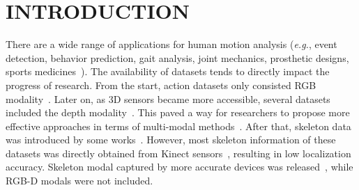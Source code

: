 \documentclass[a4paper, 10pt, conference]{ieeeconf}      \usepackage{FG2020}
\newcommand*\eg{\textit{e.g.}}
\begin{document}
\begin{table*}[!tp]
\begin{center}
\caption{Technical specifications of the sensors used in EV-Action dataset.}\label{table:sensor_sum}
\vspace{-2mm}
\end{center}
\vspace{-6mm}
\end{table*}


\section{INTRODUCTION}
There are a wide range of applications for human motion analysis (\eg, event detection, behavior prediction, gait analysis, joint mechanics, prosthetic designs, sports medicines~\cite{RGB_Recog2,3dcnn,lichen_ICCV,RGBD_HUDA,lichen_seg1,lichen_seg2,lichen_MML1,lichen_AI20}). The availability of datasets tends to directly impact the progress of research. From the start, action datasets only consisted RGB modality~\cite{RGB_Recog2}. Later on, as 3D sensors became more accessible, several datasets included the depth modality~\cite{RGBD_Survey,MSRAction3D, RGBD_data2,RGBD_data4}. This paved a way for researchers to propose more effective approaches in terms of multi-modal methods~\cite{3dcnn,lichen_ICCV,RGBD_HUDA}. After that, skeleton data was introduced by some works~\cite{SK_Recog1,SK_Recog2}. However, most skeleton information of these datasets was directly obtained from Kinect sensors~\cite{kinect_v1v2}, resulting in low localization accuracy. Skeleton modal captured by more accurate devices was released~\cite{Multi_data_CMU}, while RGB-D modals were not included.
\end{document}
